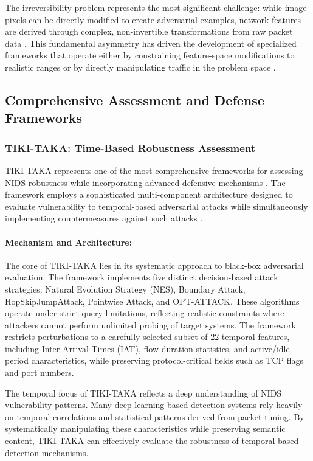 The irreversibility problem represents the most significant challenge: while image pixels can be directly modified to create adversarial examples, network features are derived through complex, non-invertible transformations from raw packet data \cite{han2021evaluating}. This fundamental asymmetry has driven the development of specialized frameworks that operate either by constraining feature-space modifications to realistic ranges or by directly manipulating traffic in the problem space \cite{vitorino2023sok}.

\subsection{Comprehensive Assessment and Defense Frameworks}

\subsubsection{TIKI-TAKA: Time-Based Robustness Assessment}

TIKI-TAKA represents one of the most comprehensive frameworks for assessing NIDS robustness while incorporating advanced defensive mechanisms \cite{zhang2022adversarial}. The framework employs a sophisticated multi-component architecture designed to evaluate vulnerability to temporal-based adversarial attacks while simultaneously implementing countermeasures against such attacks \cite{zhang2022adversarial}.

\paragraph{Mechanism and Architecture:}
The core of TIKI-TAKA lies in its systematic approach to black-box adversarial evaluation. The framework implements five distinct decision-based attack strategies: Natural Evolution Strategy (NES), Boundary Attack, HopSkipJumpAttack, Pointwise Attack, and OPT-ATTACK. These algorithms operate under strict query limitations, reflecting realistic constraints where attackers cannot perform unlimited probing of target systems. The framework restricts perturbations to a carefully selected subset of 22 temporal features, including Inter-Arrival Times (IAT), flow duration statistics, and active/idle period characteristics, while preserving protocol-critical fields such as TCP flags and port numbers.

The temporal focus of TIKI-TAKA reflects a deep understanding of NIDS vulnerability patterns. Many deep learning-based detection systems rely heavily on temporal correlations and statistical patterns derived from packet timing. By systematically manipulating these characteristics while preserving semantic content, TIKI-TAKA can effectively evaluate the robustness of temporal-based detection mechanisms.

